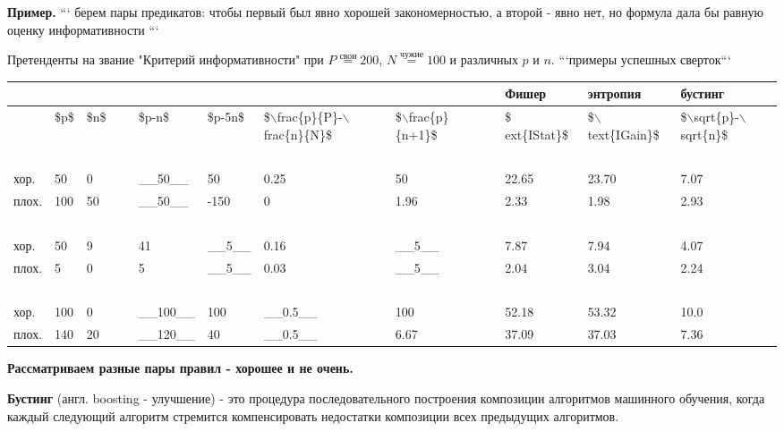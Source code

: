 \textbf{Пример.}
```
берем пары предикатов: чтобы первый был явно хорошей закономерностью, а
второй - явно нет, но формула дала бы равную оценку информативности
```

Претенденты на звание "Критерий информативности" при
$P \stackrel{\text{свои}}{=} 200$, $N \stackrel{\text{чужие}}{=} 100$ и
различных $p$ и $n$. ```примеры успешных сверток```

\begin{table}[!h]
    \centering
    \begin{tabular}{|l|l|l|l|l|l|l|l|l|l|l|l|}
    \hline
        ~ & ~ & ~ & ~ & ~ & ~ & ~ & ~ & ~ & Фишер & энтропия & бустинг \\ \hline
        ~ & \$p\$ & \$n\$ & ~ & \$p-n\$ & \$p-5n\$ & \$$\backslash$frac\{p\}\{P\}-$\backslash$frac\{n\}\{N\}\$ & \$$\backslash$frac\{p\}\{n+1\}\$ & ~ & \$	ext\{IStat\}\$ & \$$\backslash$text\{IGain\}\$ & \$$\backslash$sqrt\{p\}-$\backslash$sqrt\{n\}\$ \\ \hline
        ~ & ~ & ~ & ~ & ~ & ~ & ~ & ~ & ~ & ~ & ~ & ~ \\ \hline
        хор. & 50 & 0 & ~ & \_\_50\_\_ & 50 & 0.25 & 50 & ~ & 22.65 & 23.70 & 7.07 \\ \hline
        плох. & 100 & 50 & ~ & \_\_50\_\_ & -150 & 0 & 1.96 & ~ & 2.33 & 1.98 & 2.93 \\ \hline
        ~ & ~ & ~ & ~ & ~ & ~ & ~ & ~ & ~ & ~ & ~ & ~ \\ \hline
        хор. & 50 & 9 & ~ & 41 & \_\_5\_\_ & 0.16 & \_\_5\_\_ & ~ & 7.87 & 7.94 & 4.07 \\ \hline
        плох. & 5 & 0 & ~ & 5 & \_\_5\_\_ & 0.03 & \_\_5\_\_ & ~ & 2.04 & 3.04 & 2.24 \\ \hline
        ~ & ~ & ~ & ~ & ~ & ~ & ~ & ~ & ~ & ~ & ~ & ~ \\ \hline
        хор. & 100 & 0 & ~ & \_\_100\_\_ & 100 & \_\_0.5\_\_ & 100 & ~ & 52.18 & 53.32 & 10.0 \\ \hline
        плох. & 140 & 20 & ~ & \_\_120\_\_ & 40 & \_\_0.5\_\_ & 6.67 & ~ & 37.09 & 37.03 & 7.36 \\ \hline
    \end{tabular}
\end{table}

\textbf{Рассматриваем разные пары правил - хорошее и не очень.}

\textbf{Бустинг} (англ. boosting - улучшение) - это процедура последовательного
построения композиции алгоритмов машинного обучения, когда каждый следующий
алгоритм стремится компенсировать недостатки композиции всех предыдущих
алгоритмов.


